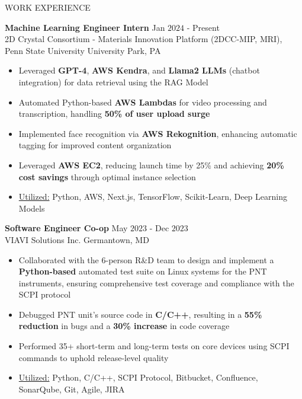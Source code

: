 \documentclass{resume} %
\begin{document}
\begin{rSection}{WORK EXPERIENCE}

{\bf Machine Learning Engineer Intern} \hfill Jan $2024$ - Present\\
2D Crystal Consortium - Materials Innovation Platform (2DCC-MIP, MRI), Penn State University \hfill University Park, PA
\begin{itemize}[itemsep = -4pt]
    \item Leveraged {\bf GPT-4}, {\bf AWS Kendra}, and {\bf Llama2 LLMs} (chatbot integration) for data retrieval using the RAG Model
    \item Automated Python-based {\bf AWS Lambdas} for video processing and transcription, handling {\bf 50\% of user upload surge}
    \item Implemented face recognition via {\bf AWS Rekognition}, enhancing automatic tagging for improved content organization
    \item Leveraged {\bf AWS EC2}, reducing launch time by 25\% and achieving {\bf 20\% cost savings} through optimal instance selection
    \item \underline{Utilized:} Python, AWS, Next.js, TensorFlow, Scikit-Learn, Deep Learning Models 
\end{itemize}

{\bf Software Engineer Co-op} \hfill May $2023$ - Dec $2023$\\
VIAVI Solutions Inc. \hfill Germantown, MD
\begin{itemize}[itemsep = -4pt]
    \item Collaborated with the $6$-person R\&D team to design and implement a {\bf Python-based} automated test suite on Linux systems for the PNT instruments, ensuring comprehensive test coverage and compliance with the SCPI protocol
    \item Debugged PNT unit's source code in {\bf C/C++}, resulting in a {\bf 55\% reduction} in bugs and a {\bf 30\% increase} in code coverage
    \item Performed 35+ short-term and long-term tests on core devices using SCPI commands to uphold release-level quality
    \item \underline{Utilized:} Python, C/C++, SCPI Protocol, Bitbucket, Confluence, SonarQube, Git, Agile, JIRA
\end{itemize}


\end{rSection}
\end{document}
